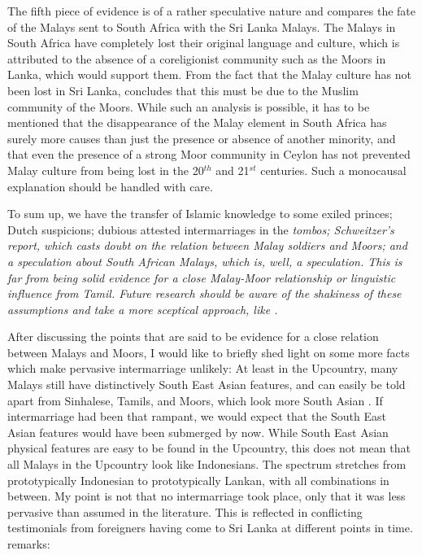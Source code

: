 The fifth piece of evidence is of a rather speculative nature and compares the fate of the Malays sent to South Africa with the Sri
Lanka Malays. The Malays in South Africa have completely lost their original language and culture, which is attributed to the
absence of a coreligionist community such as the Moors in Lanka, which would support them. From the fact that the Malay culture has
not been lost in Sri Lanka,  \citet[53]{Hussainmiya1990} concludes that this must be due to the Muslim community of the Moors. While such an analysis is possible, it has to be mentioned that the disappearance of the Malay element in South Africa has surely more causes than just the
presence or absence of another minority, and that even the presence of a strong Moor community in Ceylon has not prevented Malay culture from being lost in the 20$^{th}$ and 21$^{st}$ centuries. Such a monocausal explanation should be handled with care.

To sum up, we have  the  transfer of Islamic knowledge to some exiled princes; Dutch suspicions;  dubious attested intermarriages in the \em tombos\em; Schweitzer's report, which casts doubt on the relation between Malay soldiers and Moors; and a speculation about South African Malays, which is, well, a speculation. This is far from being solid evidence for a close Malay-Moor relationship or linguistic influence from Tamil. Future research should be aware of the shakiness of these assumptions and take a more sceptical approach, like \citet{Ansaldo2005ms}.

After discussing the points that are said to be evidence for a close relation between Malays and Moors, I would like to briefly shed light on some more facts which make pervasive intermarriage unlikely: At least in the Upcountry, many Malays still have   distinctively South East Asian features, and can easily be told apart from Sinhalese, Tamils, and Moors, which look more South Asian \citep[416]{Hussein2007}. If intermarriage had been that rampant, we would expect that the South East Asian features would have been submerged by now. While South East Asian physical features are easy to be found in the Upcountry, this does not mean that all Malays in the Upcountry look like Indonesians. The spectrum stretches from prototypically Indonesian to prototypically Lankan, with all combinations in between. My point is not that no intermarriage took place, only that it was less pervasive than assumed in the literature. This is reflected in conflicting testimonials from foreigners having come to Sri Lanka at different points in time. \citet[115]{Percival1803} remarks:

